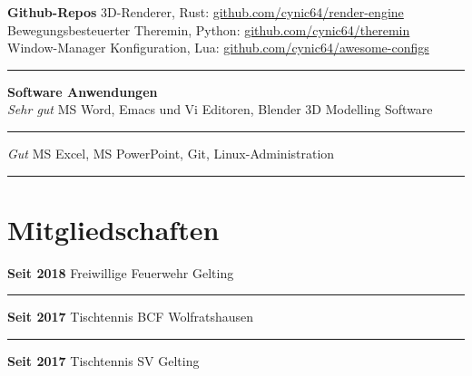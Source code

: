 \documentclass[12pt]{article}
\newcommand{\link}[1]{{\color{blue}\underline{#1}}}
\newcommand{\sect}[1]{
  {
    \vspace{12pt}
    \section*{
      \fontsize{18}{0}\selectfont
      \hspace{-12pt}
      \vspace{-12pt}
      #1
    }
    \vspace{-6pt}
  }
}
\newcommand{\sep}{{\color{gray}\vspace{-12pt}\hrule}}
\begin{document}
{
  \small
  \textbf{Github-Repos} \hfill{3D-Renderer, Rust: \link{github.com/cynic64/render-engine}} \\
  \hspace*{\fill} Bewegungsbesteuerter Theremin, Python: \link{github.com/cynic64/theremin} \\
  \hspace*{\fill} Window-Manager Konfiguration, Lua:
  \link{github.com/cynic64/awesome-configs} \\
}
\sep
\vspace{12pt}

\textbf{Software Anwendungen} \\
\textit{Sehr gut} \hfill{MS Word, Emacs und Vi Editoren, Blender 3D Modelling Software} \\
\sep
\textit{Gut} \hfill{MS Excel, MS PowerPoint, Git, Linux-Administration} \\
\sep
\vspace{12pt}

\sect{Mitgliedschaften}

\textbf{Seit 2018} \hfill{Freiwillige Feuerwehr Gelting} \\
\sep
\textbf{Seit 2017} \hfill{Tischtennis BCF Wolfratshausen} \\
\sep
\textbf{Seit 2017} \hfill{Tischtennis SV Gelting}
\end{document}
